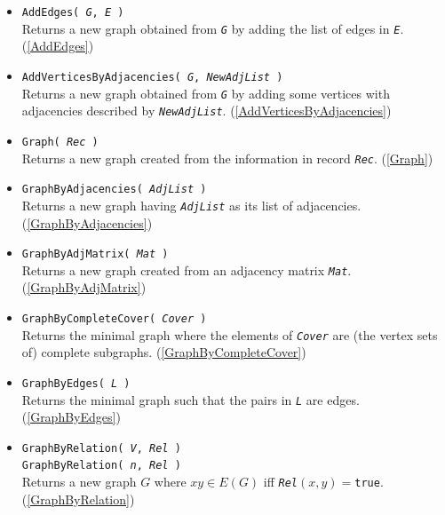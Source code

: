 \documentclass[a4paper,11pt]{report}
\begin{document}
{{\begin{itemize}
\item \texttt{AddEdges( \mbox{\texttt{\mdseries\slshape G}}, \mbox{\texttt{\mdseries\slshape E}} )}\\
 Returns a new graph obtained from \mbox{\texttt{\mdseries\slshape G}} by adding the list of edges in \mbox{\texttt{\mdseries\slshape E}}. (\ref{AddEdges}) 
\item \texttt{AddVerticesByAdjacencies( \mbox{\texttt{\mdseries\slshape G}}, \mbox{\texttt{\mdseries\slshape NewAdjList}} )}\\
 Returns a new graph obtained from \mbox{\texttt{\mdseries\slshape G}} by adding some vertices with adjacencies described by \mbox{\texttt{\mdseries\slshape NewAdjList}}. (\ref{AddVerticesByAdjacencies}) 
\item \texttt{Graph( \mbox{\texttt{\mdseries\slshape Rec}} )}\\
 Returns a new graph created from the information in record \mbox{\texttt{\mdseries\slshape Rec}}. (\ref{Graph}) 
\item \texttt{GraphByAdjacencies( \mbox{\texttt{\mdseries\slshape AdjList}} )}\\
 Returns a new graph having \mbox{\texttt{\mdseries\slshape AdjList}} as its list of adjacencies. (\ref{GraphByAdjacencies}) 
\item \texttt{GraphByAdjMatrix( \mbox{\texttt{\mdseries\slshape Mat}} )}\\
 Returns a new graph created from an adjacency matrix \mbox{\texttt{\mdseries\slshape Mat}}. (\ref{GraphByAdjMatrix}) 
\item \texttt{GraphByCompleteCover( \mbox{\texttt{\mdseries\slshape Cover}} )}\\
 Returns the minimal graph where the elements of \mbox{\texttt{\mdseries\slshape Cover}} are (the vertex sets of) complete subgraphs. (\ref{GraphByCompleteCover}) 
\item \texttt{GraphByEdges( \mbox{\texttt{\mdseries\slshape L}} )}\\
 Returns the minimal graph such that the pairs in \mbox{\texttt{\mdseries\slshape L}} are edges. (\ref{GraphByEdges}) 
\item \texttt{GraphByRelation( \mbox{\texttt{\mdseries\slshape V}}, \mbox{\texttt{\mdseries\slshape Rel}} )}\\
 \texttt{GraphByRelation( \mbox{\texttt{\mdseries\slshape n}}, \mbox{\texttt{\mdseries\slshape Rel}} )}\\
 Returns a new graph $G$ where $xy \in E(G)$ iff \mbox{\texttt{\mdseries\slshape Rel}}$(x,y)=$\texttt{true}. (\ref{GraphByRelation}) 

\end{itemize}}}
\end{document}
